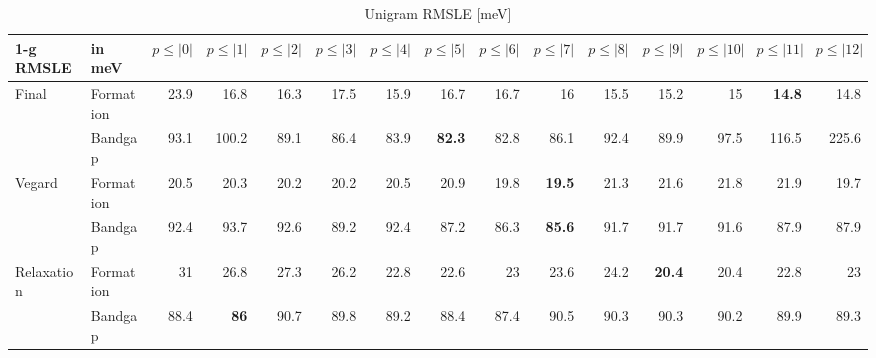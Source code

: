\documentclass[11pt,oneside,czech,american]{book} %
\theoremstyle{definition} %
\theoremstyle{definition}
\begin{document}
\begin{table}[H]
	\scriptsize
	\centering
\begin{tabular}{llrrrrrrrrrrrrr}
	\hline
	1-g RMSLE   & in meV    &   $p{\leq}|0|$ &   $p{\leq}|1|$ &   $p{\leq}|2|$ &   $p{\leq}|3|$ &   $p{\leq}|4|$ &   $p{\leq}|5|$ &   $p{\leq}|6|$ &   $p{\leq}|7|$ &   $p{\leq}|8|$ &   $p{\leq}|9|$ &   $p{\leq}|10|$ &   $p{\leq}|11|$ &   $p{\leq}|12|$ \\
	\hline
	\multirow{2}{*}{Final}       & Formation &       23.9 &       16.8 &       16.3 &       17.5 &       15.9 &       16.7 &       16.7 &       16   &       15.5 &       15.2 &        15   &        \textbf{14.8} &        14.8\\
	       & Bandgap   &       93.1 &      100.2 &       89.1 &       86.4 &       83.9 &       \textbf{82.3} &       82.8 &       86.1 &       92.4 &       89.9 &        97.5 &       116.5 &       225.6\\
	\multirow{2}{*}{Vegard}      & Formation &       20.5 &       20.3 &       20.2 &       20.2 &       20.5 &       20.9 &       19.8 &       \textbf{19.5} &       21.3 &       21.6 &        21.8 &        21.9 &        19.7\\
	     & Bandgap   &       92.4 &       93.7 &       92.6 &       89.2 &       92.4 &       87.2 &       86.3 &       \textbf{85.6} &       91.7 &       91.7 &        91.6 &        87.9 &        87.9\\
	\multirow{2}{*}{Relaxation}  & Formation &       31   &       26.8 &       27.3 &       26.2 &       22.8 &       22.6 &       23   &       23.6 &       24.2 &       \textbf{20.4} &        20.4 &        22.8 &        23\\
	  & Bandgap   &       88.4 &       \textbf{86}   &       90.7 &       89.8 &       89.2 &       88.4 &       87.4 &       90.5 &       90.3 &       90.3 &        90.2 &        89.9 &        89.3\\
	\hline
\end{tabular}	
	\caption{Unigram RMSLE [meV]}
	\label{1-g RMSLE}
\end{table}
\end{document}
